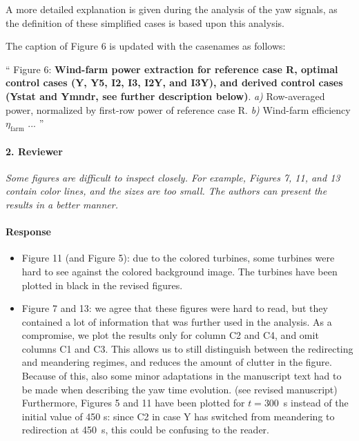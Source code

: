 \documentclass[]{article}
\newcommand{\revision}[1]{\textbf{#1}}
\begin{document}
A more detailed explanation is given during the analysis of the yaw signals, as the definition of these simplified cases is based upon this analysis.

The caption of Figure 6 is updated with the casenames as follows: 

`` 
Figure 6: \revision{Wind-farm power extraction for reference case R, optimal control cases (Y, Y5, I2, I3, I2Y, and I3Y), and derived control cases (Ystat and Ymndr, see further description below)}. \emph{a) } Row-averaged power, normalized by first-row power of reference case R. \emph{b) } Wind-farm efficiency $\eta_{\text{farm}}$ ... 
''

\hrulefill

\paragraph{2. Reviewer} \textit{Some figures are difficult to inspect closely. For example, Figures 7, 11, and 13 contain color lines, and the sizes are too small. The authors can present the results in a better manner.}

\paragraph{Response} 

\begin{itemize}
	\item Figure 11 (and Figure 5): due to the colored turbines, some turbines were hard to see against the colored background image. The turbines have been plotted in black in the revised figures. 
	\item Figure 7 and 13: we agree that these figures were hard to read, but they contained a lot of information that was further used in the analysis. As a compromise, we plot the results only for column C2 and C4, and omit columns C1 and C3. This allows us to still distinguish between the redirecting and meandering regimes, and reduces the amount of clutter in the figure. Because of this, also some  minor adaptations in the manuscript text had to be made when describing the yaw time evolution. (see revised manuscript) Furthermore, Figures 5 and 11 have been plotted for $t=300$~s instead of the initial value of 450 s: since C2 in case Y has switched from meandering to redirection at 450~s, this could be confusing to the reader. 
\end{itemize}
	
\hrulefill
\end{document}
